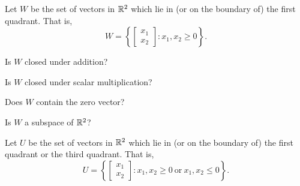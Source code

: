 \endedxtext


\endedxvertical







Let $W$ be the set of vectors in $\mathbb R^2$ which lie in (or on the boundary of) the first quadrant.  
That is,
\[ W = \left\{ \left[ \begin{array}{c} x_1 \\ x_2 \end{array} \right] : x_1, x_2 \ge 0\right\}. \]



\begin{center}
   
\end{center}

Is $W$ closed under addition?


Is $W$ closed under scalar multiplication?


Does $W$ contain the zero vector?


Is $W$ a subspace of $\mathbb R^2$?  



 
\endedxproblem



Let $U$ be the set of vectors in $\mathbb R^2$ which lie in (or on the boundary of) the first quadrant or
the third quadrant.  
That is,
\[ U = \left\{ \left[ \begin{array}{c} x_1 \\ x_2 \end{array} \right] : x_1, x_2 \ge 0 \ \mathrm{or} \ x_1,x_2 \le 0\right\}. \]

